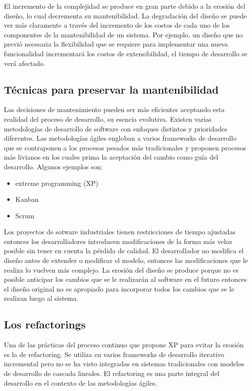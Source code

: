 El incremento de la complejidad se produce en gran parte debido a la erosión del diseño, lo cual
decrementa su mantenibilidad. La degradación del diseño se puede ver más claramente a través del
incremento de los costos de cada uno de los componentes de la mantenibilidad de un sistema. Por ejemplo,
un diseño que no previó necesaria la flexibilidad que se requiere para implementar una nueva funcionalidad
incrementará los costos de extensibilidad, el tiempo de desarrollo se verá afectado.


\subsection{Técnicas para preservar la mantenibilidad}

Las decisiones de mantenimiento pueden ser más eficientes aceptando esta realidad del proceso de
desarrollo, su esencia evolutiva. Existen varias metodologías de desarrollo de software con enfoques
distintos y prioridades diferentes. Las metodologías ágiles engloban a varios frameworks de desarrollo
que se contraponen a los procesos pesados más tradicionales y proponen procesos más livianos en los
cuales prima la aceptación del cambio como guía del desarrollo. Algunos ejemplos son:

\begin{itemize}
    \item extreme programming (XP)
    \item Kanban
    \item Scrum
\end{itemize}

Los proyectos de sotware industriales tienen restricciones de tiempo ajustadas entonces los
desarrolladores introducen modificaciones de la forma más veloz posible sin tener en cuenta la
pérdida de calidad. El desarrollador no modifica el diseño antes de extender o modificar el modelo,
entonces las modificaciones que le realiza lo vuelven más complejo. La erosión del diseño se produce
porque no es posible anticipar los cambios que se le realizarán al software en el futuro entonces el
diseño original no es apropiado para incorporar todos los cambios que se le realizan luego al
sistema. 

\subsection{Los refactorings}
Una de las prácticas del proceso continuo que propone XP para evitar la erosión es la de refactoring.
Se utiliza en varios frameworks de desarrollo iterativo incremental pero no se ha visto integradas en
sistemas tradicionales con modelos de desarrollo de cascada lineales. El refactoring es una parte
integral del desarrollo en el contexto de las metodologías ágiles.

